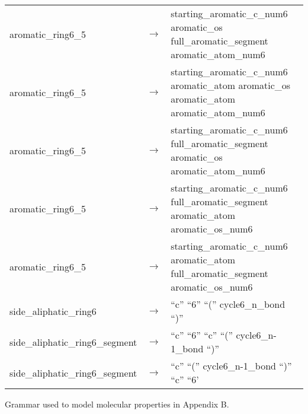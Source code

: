 \begin{longtable}{m{} p{} p{}}
    aromatic\_ring6\_5 & $\rightarrow$ & starting\_aromatic\_c\_num6 aromatic\_os full\_aromatic\_segment aromatic\_atom\_num6 \\
    aromatic\_ring6\_5 & $\rightarrow$ & starting\_aromatic\_c\_num6 aromatic\_atom aromatic\_os aromatic\_atom aromatic\_atom\_num6 \\
    aromatic\_ring6\_5 & $\rightarrow$ & starting\_aromatic\_c\_num6 full\_aromatic\_segment aromatic\_os aromatic\_atom\_num6 \\
    aromatic\_ring6\_5 & $\rightarrow$ & starting\_aromatic\_c\_num6 full\_aromatic\_segment aromatic\_atom aromatic\_os\_num6 \\
    aromatic\_ring6\_5 & $\rightarrow$ & starting\_aromatic\_c\_num6 aromatic\_atom full\_aromatic\_segment aromatic\_os\_num6 \\
    side\_aliphatic\_ring6 & $\rightarrow$ & ``c'' ``6'' ``('' cycle6\_n\_bond ``)'' \\
    side\_aliphatic\_ring6\_segment & $\rightarrow$ & ``c'' ``6'' ``c'' ``('' cycle6\_n-1\_bond ``)'' \\
    side\_aliphatic\_ring6\_segment & $\rightarrow$ & ``c'' ``('' cycle6\_n-1\_bond ``)'' ``c'' ``6'
\end{longtable}
\normalsize

\label{annex:grammar-lipinski}

Grammar used to model molecular properties in Appendix B\@.

